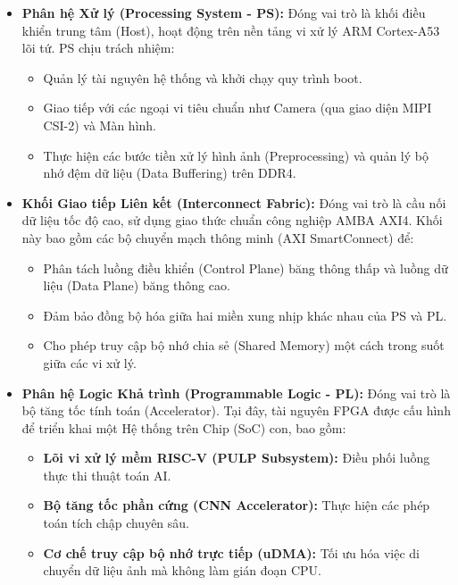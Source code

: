 \begin{itemize}
    \item \textbf{Phân hệ Xử lý (Processing System - PS):} 
    Đóng vai trò là khối điều khiển trung tâm (Host), hoạt động trên nền tảng vi xử lý ARM Cortex-A53 lõi tứ. PS chịu trách nhiệm:
    \begin{itemize}
        \item Quản lý tài nguyên hệ thống và khởi chạy quy trình boot.
        \item Giao tiếp với các ngoại vi tiêu chuẩn như Camera (qua giao diện MIPI CSI-2) và Màn hình.
        \item Thực hiện các bước tiền xử lý hình ảnh (Preprocessing) và quản lý bộ nhớ đệm dữ liệu (Data Buffering) trên DDR4.
    \end{itemize}

    \item \textbf{Khối Giao tiếp Liên kết (Interconnect Fabric):} 
    Đóng vai trò là cầu nối dữ liệu tốc độ cao, sử dụng giao thức chuẩn công nghiệp AMBA AXI4. Khối này bao gồm các bộ chuyển mạch thông minh (AXI SmartConnect) để:
    \begin{itemize}
        \item Phân tách luồng điều khiển (Control Plane) băng thông thấp và luồng dữ liệu (Data Plane) băng thông cao.
        \item Đảm bảo đồng bộ hóa giữa hai miền xung nhịp khác nhau của PS và PL.
        \item Cho phép truy cập bộ nhớ chia sẻ (Shared Memory) một cách trong suốt giữa các vi xử lý.
    \end{itemize}

    \item \textbf{Phân hệ Logic Khả trình (Programmable Logic - PL):} 
    Đóng vai trò là bộ tăng tốc tính toán (Accelerator). Tại đây, tài nguyên FPGA được cấu hình để triển khai một Hệ thống trên Chip (SoC) con, bao gồm:
    \begin{itemize}
        \item \textbf{Lõi vi xử lý mềm RISC-V (PULP Subsystem):} Điều phối luồng thực thi thuật toán AI.
        \item \textbf{Bộ tăng tốc phần cứng (CNN Accelerator):} Thực hiện các phép toán tích chập chuyên sâu.
        \item \textbf{Cơ chế truy cập bộ nhớ trực tiếp (uDMA):} Tối ưu hóa việc di chuyển dữ liệu ảnh mà không làm gián đoạn CPU.
    \end{itemize}
\end{itemize}

